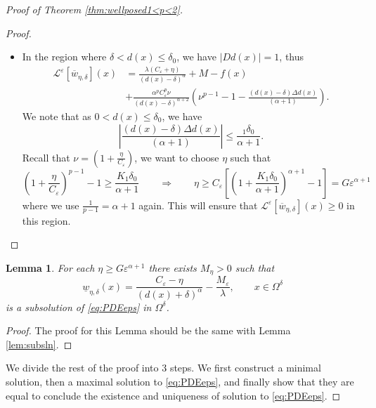 \documentclass[11pt,reqno]{amsart}
\numberwithin{figure}{section}
\theoremstyle{plain}
\newtheorem{lem}[thm]{Lemma}
\theoremstyle{remark}
\numberwithin{equation}{section}
\begin{document}
\begin{appendices}
\begin{proof} [Proof of Theorem \ref{thm:wellposed1<p<2}]
\begin{proof}
\begin{itemize}
    \item In the region where $\delta < d(x)\leq \delta_0$, we have $|Dd(x)|=1$, thus
    \begin{align*}
         \mathcal{L}^\varepsilon\left[\overline{w}_{\eta,\delta}\right](x) &= \frac{\lambda(C_\varepsilon + \eta)}{(d(x)-\delta)^\alpha} + M - f(x)\\
         & + \frac{\alpha^p C_\varepsilon^p\nu }{(d(x)-\delta)^{\alpha+2}}\left(\nu^{p-1} - 1 - \frac{ (d(x)-\delta)\Delta d(x)}{(\alpha+1)}\right).
    \end{align*}
    We note that as $0<d(x)\leq \delta_0$, we have
    \begin{equation*}
        \left|\frac{(d(x)-\delta)\Delta  d(x)}{(\alpha+1)}\right| \leq \frac{_1\delta_0}{\alpha+1}.
    \end{equation*}
    Recall that $\nu = \left(1+\frac{\eta}{C_\varepsilon}\right)$, we want to choose $\eta$ such that
    \begin{equation*}
        \left(1+\frac{\eta}{C_\varepsilon}\right)^{p-1} - 1 \geq \frac{K_1\delta_0}{\alpha+1} \qquad\Longrightarrow\qquad \eta \geq C_\varepsilon\left[\left(1+\frac{K_1\delta_0}{\alpha+1}\right)^{\alpha+1}-1\right] = G\varepsilon^{\alpha+1}
    \end{equation*}
    where we use $\frac{1}{p-1} = \alpha+1$ again. This will ensure that $\mathcal{L}^\varepsilon\left[\overline{w}_{\eta,\delta}\right](x) \geq 0$ in this region.
\end{itemize}
\end{proof}

\begin{lem}\label{lem:supersln} For each $\eta\geq G\varepsilon^{\alpha+1}$ there exists $M_\eta > 0$ such that 
\begin{equation*}
    \underline{w}_{\eta, \delta}(x) = \frac{C_\varepsilon-\eta}{(d(x)+\delta)^\alpha} -\frac{M_\varepsilon}{\lambda}, \qquad x\in \Omega^\delta 
\end{equation*}
is a subsolution of \eqref{eq:PDEeps} in $\Omega^\delta$.
\end{lem}

\begin{proof} The proof for this Lemma should be the same with Lemma \ref{lem:subsln}.
\end{proof}

\noindent We divide the rest of the proof into 3 steps. We first construct a minimal solution, then a maximal solution to \eqref{eq:PDEeps}, and finally show that they are equal to conclude the existence and uniqueness of solution to \eqref{eq:PDEeps}.


\end{proof}
\end{appendices}
\end{document}
